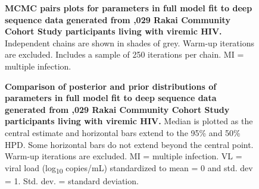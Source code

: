 \documentclass[10pt,letterpaper]{article}
\begin{document}
\begin{figure}[!ht]
\caption{{\bf MCMC pairs plots for parameters in full model fit to deep sequence data generated from ,029 Rakai Community Cohort Study participants living with viremic HIV.} Independent chains are shown in shades of grey. Warm-up iterations are excluded. Includes a sample of 250 iterations per chain. MI = multiple infection. }
\end{figure}

\begin{figure}[!ht]
\caption{{\bf Comparison of posterior and prior distributions of parameters in full model fit to deep sequence data generated from ,029 Rakai Community Cohort Study participants living with viremic HIV.} Median is plotted as the central estimate and horizontal bars extend to the 95\% and 50\% HPD. Some horizontal bars do not extend beyond the central point. Warm-up iterations are excluded. MI = multiple infection. VL = viral load (log\textsubscript{10} copies/mL) standardized to mean = 0 and std. dev = 1. Std. dev. = standard deviation. }
\end{figure}
\end{document}
